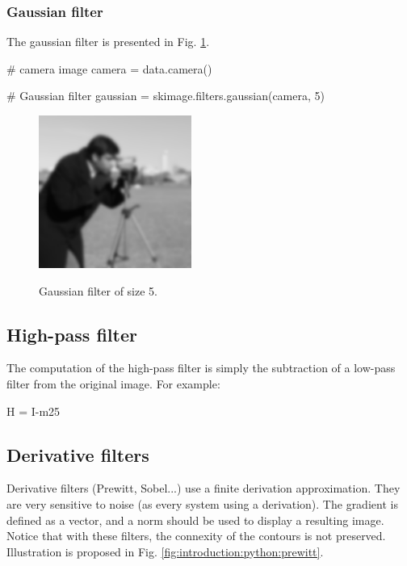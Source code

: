 \subsubsection{Gaussian filter}
The gaussian filter is presented in Fig. \ref{fig:introduction:python:gaussian}.
\begin{python}
# camera image
camera = data.camera()

# Gaussian filter
gaussian = skimage.filters.gaussian(camera, 5)
\end{python}

\vspace*{-4pt}

\begin{figure}[H]
 \centering\caption{Gaussian filter of size 5.}%
 \includegraphics[width=5cm]{gaussian.png}%
 \label{fig:introduction:python:gaussian}%
\end{figure}

\subsection{High-pass filter}
The computation of the high-pass filter is simply the subtraction of a low-pass filter from the original image. For example:

\begin{python}
H = I-m25
\end{python}


\vspace*{-7pt}
\subsection{Derivative filters}
Derivative filters (Prewitt, Sobel...) use a finite derivation approximation. They are very sensitive to noise (as every system using a derivation). The gradient is defined as a vector, and a norm should be used to display a resulting image. Notice that with these filters, the connexity of the contours is not preserved.
Illustration is proposed in Fig. \ref{fig:introduction:python:prewitt}.

